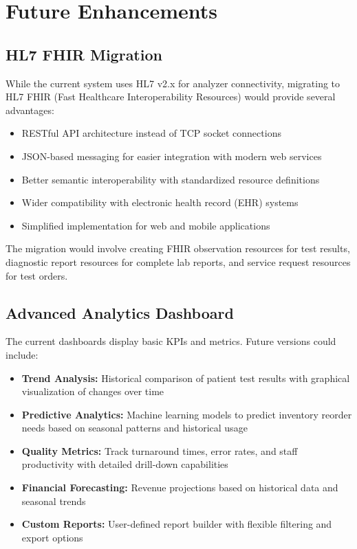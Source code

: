 \documentclass[12pt, a4paper]{report}
\begin{document}
\section{Future Enhancements}

\subsection{HL7 FHIR Migration}
While the current system uses HL7 v2.x for analyzer connectivity, migrating to HL7 FHIR (Fast Healthcare Interoperability Resources) would provide several advantages:
\begin{itemize}
    \item RESTful API architecture instead of TCP socket connections
    \item JSON-based messaging for easier integration with modern web services
    \item Better semantic interoperability with standardized resource definitions
    \item Wider compatibility with electronic health record (EHR) systems
    \item Simplified implementation for web and mobile applications
\end{itemize}

The migration would involve creating FHIR observation resources for test results, diagnostic report resources for complete lab reports, and service request resources for test orders.

\subsection{Advanced Analytics Dashboard}
The current dashboards display basic KPIs and metrics. Future versions could include:
\begin{itemize}
    \item \textbf{Trend Analysis:} Historical comparison of patient test results with graphical visualization of changes over time
    \item \textbf{Predictive Analytics:} Machine learning models to predict inventory reorder needs based on seasonal patterns and historical usage
    \item \textbf{Quality Metrics:} Track turnaround times, error rates, and staff productivity with detailed drill-down capabilities
    \item \textbf{Financial Forecasting:} Revenue projections based on historical data and seasonal trends
    \item \textbf{Custom Reports:} User-defined report builder with flexible filtering and export options
\end{itemize}
\end{document}
